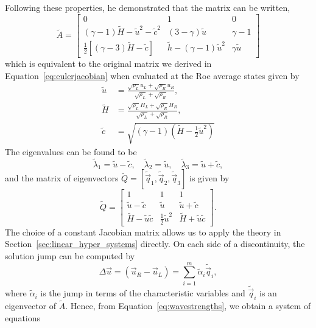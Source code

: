 Following these properties, he demonstrated that the matrix can be written,
\begin{equation}
	\tilde A = 
	\begin{bmatrix}
		0 & 1 & 0 \\ 
		(\gamma-1)\tilde H - \tilde u^2-\tilde c^2 & (3-\gamma)\tilde u & \gamma-1 \\
		\frac{1}{2}\left[(\gamma-3)\tilde H - \tilde c\right] & \tilde h - (\gamma-1)\tilde u^2 & \gamma \tilde u
	\end{bmatrix}
\end{equation}
which is equivalent to the original matrix we derived in Equation~\ref{eq:eulerjacobian} when evaluated at the Roe average states given by 
\begin{align}
	\tilde u &= \frac{\sqrt{\rho_L} u_L + \sqrt{\rho_R} u_R}{\sqrt{\rho_L} + \sqrt{\rho_R}},\\
	\tilde H &= \frac{\sqrt{\rho_L} H_L + \sqrt{\rho_R} H_R}{\sqrt{\rho_L} + \sqrt{\rho_R}},\\
	\tilde c &= \sqrt{(\gamma-1)(\tilde H - \frac{1}{2} \tilde u^2)}
\end{align}
The eigenvalues can be found to be 
\begin{equation}
	\tilde\lambda_1 = \tilde u - \tilde c,\quad \tilde\lambda_2 = \tilde u,\quad\tilde\lambda_3 = \tilde u + \tilde c,
\end{equation}
and the matrix of eigenvectors $\tilde Q=[\tilde{\vec q}_1, \tilde{\vec q}_2, \tilde{\vec q}_3]$ is given by
\begin{equation}
	\tilde Q = 
	\begin{bmatrix}
	1 & 1 & 1 \\ 
	\tilde u - \tilde c & \tilde u & \tilde u + \tilde c \\ 
	\tilde H - \tilde u \tilde c & \frac{1}{2} \tilde u^2 & \tilde H + \tilde u \tilde c
	\end{bmatrix}.
\end{equation}
The choice of a constant Jacobian matrix allows us to apply the theory in Section~\ref{sec:linear_hyper_systems} directly. On each side of a discontinuity, the solution jump can be computed by
\begin{equation}
	\Delta \vec u = \left(\vec u_R - \vec u_L\right) = \sum_{i=1}^m \tilde \alpha_i \tilde{\vec q}_i,
	\label{eq:wavestrengths}
\end{equation}
where $\tilde \alpha_i$ is the jump in terms of the characteristic variables and $\tilde{\vec q}_i$ is an eigenvector of $\tilde A$. Hence, from Equation~\ref{eq:wavestrengths}, we obtain a system of equations 
